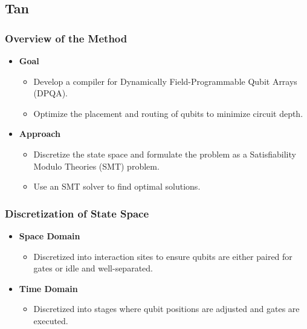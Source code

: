 \documentclass[18 pt]{beamer}
\begin{document}
\subsection{Tan}
\begin{frame}
    \frametitle{Overview of the Method}
    \begin{itemize}
        \item \textbf{Goal}
        \begin{itemize}
            \item Develop a compiler for Dynamically Field-Programmable Qubit Arrays (DPQA).
            \item Optimize the placement and routing of qubits to minimize circuit depth.
        \end{itemize}
        \item \textbf{Approach}
        \begin{itemize}
            \item Discretize the state space and formulate the problem as a Satisfiability Modulo Theories (SMT) problem.
            \item Use an SMT solver to find optimal solutions.
        \end{itemize}
    \end{itemize}
\end{frame}
\begin{frame}
    \frametitle{Discretization of State Space}
    \begin{itemize}
        \item \textbf{Space Domain}
        \begin{itemize}
            \item Discretized into interaction sites to ensure qubits are either paired for gates or idle and well-separated.
        \end{itemize}
        \item \textbf{Time Domain}
        \begin{itemize}
            \item Discretized into stages where qubit positions are adjusted and gates are executed.
        \end{itemize}
    \end{itemize}
\end{frame}
\end{document}
